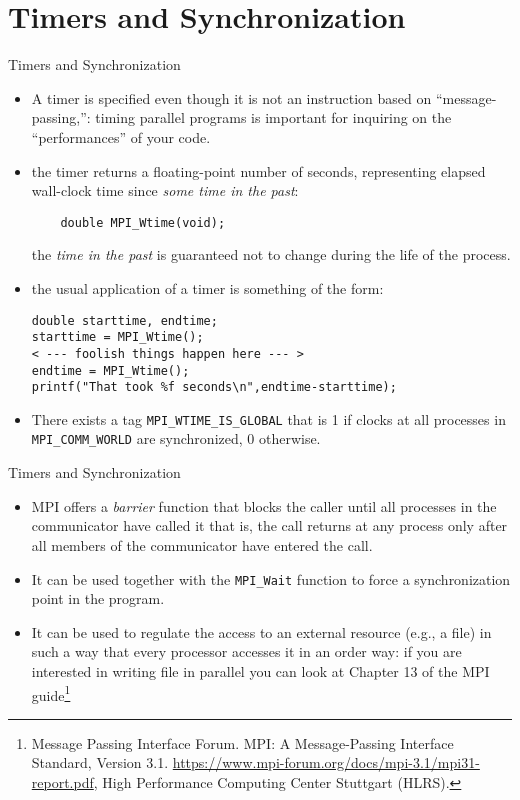 \documentclass[xcolor={svgnames,usenames}]{beamer}
\begin{document}
\section{Timers and Synchronization}

\begin{frame}[fragile]{Timers and Synchronization}
\begin{itemize}
	\item<1-> A timer is specified even though it is not an instruction based on ``message-passing,'': timing parallel programs is important for inquiring on the ``performances'' of your code.
	\item<2-> the timer returns a floating-point number of seconds, representing elapsed wall-clock time since \emph{some time in the past}:
	\begin{verbatim}
	double MPI_Wtime(void);
	\end{verbatim}
	the \emph{time in the past} is guaranteed not to change during the life of the process.
	\item<3-> the usual application of a timer is something of the form:
\begin{verbatim}
double starttime, endtime;
starttime = MPI_Wtime();
< --- foolish things happen here --- >
endtime = MPI_Wtime();
printf("That took %f seconds\n",endtime-starttime);
\end{verbatim}
	\item<4-> There exists a tag \texttt{MPI_WTIME_IS_GLOBAL} that is 1 if clocks at all processes in \texttt{MPI_COMM_WORLD} are synchronized, 0 otherwise.
\end{itemize}
\end{frame}

\begin{frame}[fragile]{Timers and Synchronization}
\begin{itemize}
\item MPI offers a \emph{barrier} function that blocks the caller until all processes in the communicator have called it 
that is, the call returns at any process only after all members of the communicator have entered the call. 
\item<2-> It can be used together with the \texttt{MPI_Wait} function to force a synchronization point in the program.
\item<3-> It can be used to regulate the access to an external resource (e.g., a file) in such a way that every processor accesses it in an order way: if you are interested in writing file in parallel you can look at Chapter 13 of the MPI guide\footnote<3->{Message Passing Interface Forum. MPI: A Message-Passing Interface Standard, Version 3.1. \url{https://www.mpi-forum.org/docs/mpi-3.1/mpi31-report.pdf}, High Performance Computing Center Stuttgart (HLRS).}
\end{itemize}

\end{frame}
\end{document}
